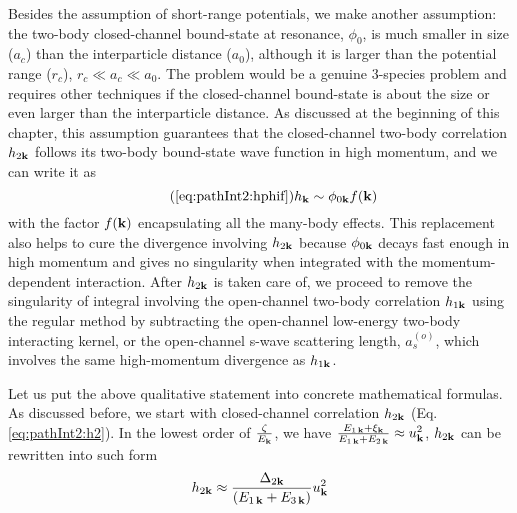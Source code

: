 Besides the assumption of short-range potentials, we make another assumption:  the  two-body closed-channel bound-state at resonance, $\phi_{0}$, is much smaller in size ($a_{c}$) than the interparticle distance ($a_{0}$), although it is  larger than the potential range ($r_{c}$),    $r_{c}\ll{}a_{c}\ll{}a_{0}$.  The problem would be a genuine 3-species problem and requires other techniques if the closed-channel bound-state is about the size  or even larger than the interparticle distance. As discussed at the beginning of this chapter, this assumption guarantees that the closed-channel two-body correlation $h_{2\mathbf{k}}$ follows its two-body bound-state wave function in high momentum, and  we can write it as 
\begin{equation}\tag{\ref{eq:pathInt2:hphif}}
h_{\vk}\sim\phi_{0\vk}f(\vk)
\end{equation}
with the factor $f(\mathbf{k})$ encapsulating all the many-body effects. This replacement also helps to  cure the divergence involving $h_{2\mathbf{k}}$ because $\phi_{0\mathbf{k}}$ decays fast enough in high momentum and gives no singularity when integrated with the momentum-dependent interaction.   After $h_{2\mathbf{k}}$ is taken care of, we proceed to remove the singularity of integral involving the open-channel two-body correlation $h_{1\mathbf{k}}$ using the regular method by subtracting the open-channel low-energy two-body interacting kernel, or the open-channel s-wave scattering length, $a_{s}^{(o)}$, which involves  the same high-momentum divergence as $h_{1\mathbf{k}}$. 



Let us put the above qualitative statement into concrete mathematical formulas.   As discussed before, we start with  closed-channel correlation $h_{2\mathbf{k}}$ (Eq. \ref{eq:pathInt2:h2}). In the lowest order of $\frac{\zeta}{E_{\mathbf{k}}}$, we have $\frac{E_{1\,\mathbf{k}}+\xi_{\mathbf{k}}}{E_{1\,\mathbf{k}}+E_{2\,\mathbf{k}}}\approx{}u_{\mathbf{k}}^{2}$, $h_{2\mathbf{k}}$ can be rewritten into such form
\begin{equation}\label{eq:pathInt2:h2D2}
 h_{2\mathbf{k}}\approx\frac{\Delta_{2\mathbf{k}}}{(E_{1\,\mathbf{k}}+E_{3\,\mathbf{k}})}u_{\mathbf{k}}^{2}
\end{equation}

